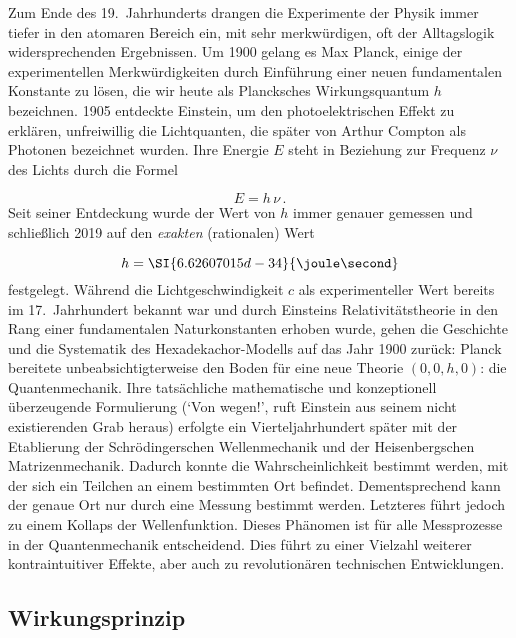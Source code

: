 
\newpage {}
\label{sec:0010}

Zum Ende des 19.\ Jahrhunderts drangen die Experimente der Physik immer tiefer in den atomaren Bereich ein, mit sehr merkwürdigen, oft der Alltagslogik widersprechenden Ergebnissen. Um 1900 gelang es Max Planck, einige der experimentellen Merkwürdigkeiten durch Einführung einer neuen fundamentalen Konstante zu lösen, die wir heute als Plancksches Wirkungsquantum $h$ bezeichnen. 1905 entdeckte Einstein, um den photoelektrischen Effekt zu erklären, unfreiwillig die Lichtquanten, die später von Arthur Compton als Photonen bezeichnet wurden. Ihre Energie $E$ steht in Beziehung zur Frequenz $\nu$ des Lichts durch die Formel

\begin{equation*}
  E=h\,\nu\,.
\end{equation*}
%
Seit seiner Entdeckung wurde der Wert von $h$ immer genauer gemessen und schließlich 2019 auf den \emph{exakten} (rationalen) Wert  

\begin{equation*}
  h=\SI{6.62607015d-34}{\joule\second}
\end{equation*}
%
festgelegt. Während die Lichtgeschwindigkeit $c$ als experimenteller Wert bereits im 17.\ Jahrhundert bekannt war und durch Einsteins Relativitätstheorie in den Rang einer fundamentalen Naturkonstanten erhoben wurde, gehen die Geschichte und die Systematik des Hexadekachor-Modells auf das Jahr 1900 zurück: Planck bereitete unbeabsichtigterweise den Boden für eine neue Theorie $(0,0,h,0)$: die Quantenmechanik. Ihre tatsächliche mathematische und konzeptionell überzeugende Formulierung (\enquote*{Von wegen!}, ruft Einstein aus seinem nicht existierenden Grab heraus) erfolgte ein Vierteljahrhundert später mit der Etablierung der Schrödingerschen Wellenmechanik und der Heisenbergschen Matrizenmechanik. Dadurch konnte die Wahrscheinlichkeit bestimmt werden, mit der sich ein Teilchen an einem bestimmten Ort befindet. Dementsprechend kann der genaue Ort nur durch eine Messung bestimmt werden. Letzteres führt jedoch zu einem Kollaps der Wellenfunktion. Dieses Phänomen ist für alle Messprozesse in der Quantenmechanik entscheidend. Dies führt zu einer Vielzahl weiterer kontraintuitiver Effekte, aber auch zu revolutionären technischen Entwicklungen.


\subsection*{Wirkungsprinzip}

